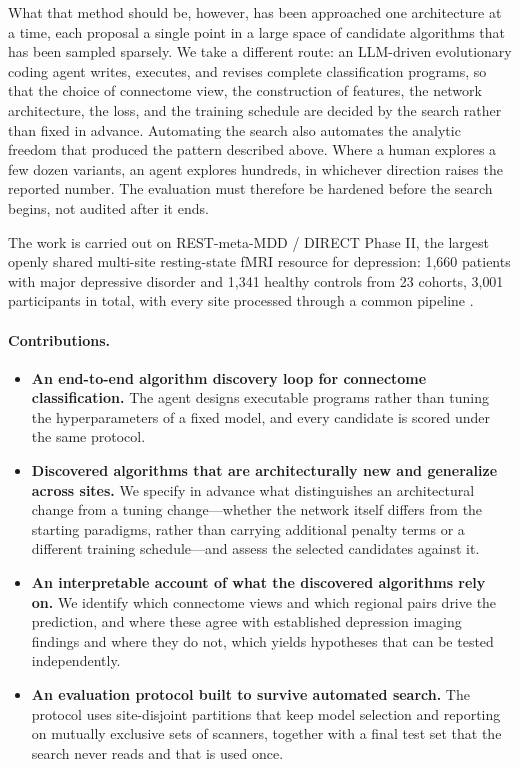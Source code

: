 What that method should be, however, has been approached one architecture at a time, each proposal
a single point in a large space of candidate algorithms that has been sampled sparsely. We take a
different route: an LLM-driven evolutionary coding agent writes, executes, and revises complete
classification programs, so that the choice of connectome view, the construction of features, the
network architecture, the loss, and the training schedule are decided by the search rather than
fixed in advance. Automating the search also automates the analytic freedom that produced the
pattern described above. Where a human explores a few dozen variants, an agent explores hundreds,
in whichever direction raises the reported number. The evaluation must therefore be hardened before
the search begins, not audited after it ends.

The work is carried out on REST-meta-MDD / DIRECT Phase II, the largest openly shared multi-site
resting-state fMRI resource for depression: 1{,}660 patients with major depressive disorder and
1{,}341 healthy controls from 23 cohorts, 3{,}001 participants in total, with every site processed
through a common pipeline \citep{direct2}.

\paragraph{Contributions.}
\begin{itemize}
  \item \textbf{An end-to-end algorithm discovery loop for connectome classification.} The agent
    designs executable programs rather than tuning the hyperparameters of a fixed model, and every
    candidate is scored under the same protocol.

  \item \textbf{Discovered algorithms that are architecturally new and generalize across sites.}
    We specify in advance what distinguishes an architectural change from a tuning change---whether
    the network itself differs from the starting paradigms, rather than carrying additional penalty
    terms or a different training schedule---and assess the selected candidates against it.

  \item \textbf{An interpretable account of what the discovered algorithms rely on.} We identify
    which connectome views and which regional pairs drive the prediction, and where these agree
    with established depression imaging findings and where they do not, which yields hypotheses
    that can be tested independently.

  \item \textbf{An evaluation protocol built to survive automated search.} The protocol uses
    site-disjoint partitions that keep model selection and reporting on mutually exclusive sets of
    scanners, together with a final test set that the search never reads and that is used once.
\end{itemize}

